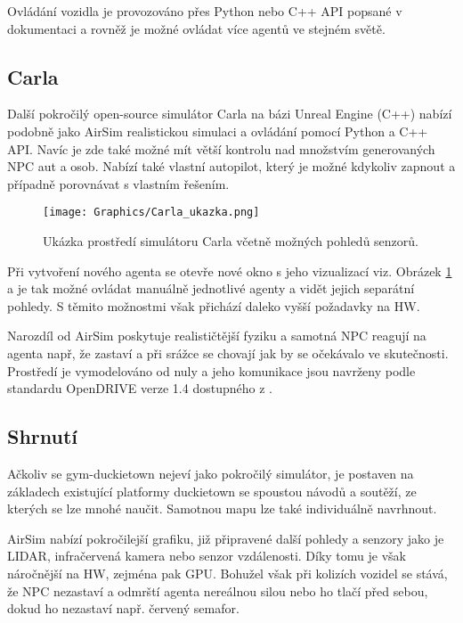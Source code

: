 \documentclass[czech, bc, kky, he, iso690numb]{fasthesis}
\begin{document}
    			Ovládání vozidla je provozováno přes Python nebo C++ API popsané v dokumentaci \cite{airsim_documentation} a rovněž je možné ovládat více agentů ve stejném světě.
	    		
	    	\subsection{Carla}
	    		Další pokročilý open-source simulátor Carla na bázi Unreal Engine (C++) nabízí podobně jako AirSim realistickou simulaci a ovládání pomocí Python a C++ API. Navíc je zde také možné mít větší kontrolu nad množstvím generovaných NPC aut a osob. Nabízí také vlastní autopilot, který je možné kdykoliv zapnout a případně porovnávat s vlastním řešením.
	    		
		    		\begin{figure}[h]
		    			\centering
		    			\texttt{[image: Graphics/Carla\_ukazka.png]}
		    			\caption{Ukázka prostředí simulátoru Carla včetně možných pohledů senzorů.}
		    			\label{pic:Carla_ukazka}
		    		\end{figure}
	    		
	    		Při vytvoření nového agenta se otevře nové okno s jeho vizualizací viz. Obrázek \ref{pic:Carla_ukazka} a je tak možné ovládat manuálně jednotlivé agenty a vidět jejich separátní pohledy. S těmito možnostmi však přichází daleko vyšší požadavky na HW.
	    		
	    		Narozdíl od AirSim poskytuje realističtější fyziku a samotná NPC reagují na agenta např, že zastaví a při srážce se chovají jak by se očekávalo ve skutečnosti. Prostředí je vymodelováno od nuly a jeho komunikace jsou navrženy podle standardu OpenDRIVE\textsuperscript{\textregistered} verze 1.4 dostupného z \cite{OpenDrive}.
	    		
	    	\subsection{Shrnutí}
	    		Ačkoliv se gym-duckietown nejeví jako pokročilý simulátor, je postaven na základech existující platformy duckietown se spoustou návodů a soutěží, ze kterých se lze mnohé naučit. Samotnou mapu lze také individuálně navrhnout.
	    		
	    		AirSim nabízí pokročilejší grafiku, již připravené další pohledy a senzory jako je LIDAR, infračervená kamera nebo senzor vzdálenosti. Díky tomu je však náročnější na HW, zejména pak GPU. Bohužel však při kolizích vozidel se stává, že NPC nezastaví a odmrští agenta nereálnou silou nebo ho tlačí před sebou, dokud ho nezastaví např. červený semafor.
	    		
\end{document}
